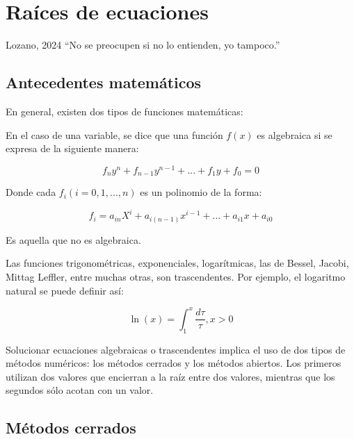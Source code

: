 \chapter{Raíces de ecuaciones}

\begin{chapquote}{Lozano, 2024}
    ``No se preocupen si no lo entienden, yo tampoco.''
\end{chapquote}

\section{Antecedentes matemáticos}

En general, existen dos tipos de funciones matemáticas:

\begin{definition}
    En el caso de una variable, se dice que una función \(f(x)\) es
    algebraica si se expresa de la siguiente manera:

    \[
        f_n y^n + f_{n-1} y^{n-1} + ... + f_1 y + f_0 = 0
    \]

    Donde cada \(f_i (i = 0, 1, ..., n)\) es un polinomio de la forma:

    \[
        f_i = a_{in} X^i + a_{i(n-1)} x^{i-1} + ... + a_{i1} x + a_{i0}
    \]
\end{definition}

\begin{definition}
    Es aquella que no es algebraica.
\end{definition}

\begin{eg}
    Las funciones trigonométricas, exponenciales, logarítmicas, las de
    Bessel, Jacobi, Mittag Leffler, entre muchas otras, son trascendentes.
    Por ejemplo, el logaritmo natural se puede definir así:

    \[
        \boxed{\ln(x) = \int_1^x \frac{d \tau}{\tau}, x > 0}
    \]

\end{eg}

Solucionar ecuaciones algebraicas o trascendentes implica el uso de dos tipos
de métodos numéricos: los métodos cerrados y los métodos abiertos. Los primeros
utilizan dos valores que encierran a la raíz entre dos valores, mientras que
los segundos sólo acotan con un valor.

\section{Métodos cerrados}

